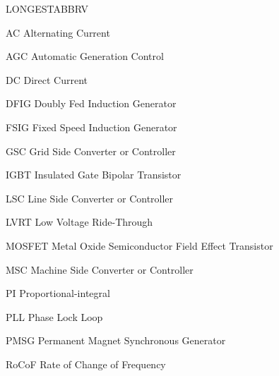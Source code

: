 \begin{theglossary}{LONGESTABBRV}

\item[AC] Alternating Current
\item[AGC] Automatic Generation Control
\item[DC] Direct Current
\item[DFIG] Doubly Fed Induction Generator
\item[FSIG] Fixed Speed Induction Generator
\item[GSC] Grid Side Converter or Controller
\item[IGBT] Insulated Gate Bipolar Transistor
\item[LSC] Line Side Converter or Controller
\item[LVRT] Low Voltage Ride-Through
\item[MOSFET] Metal Oxide Semiconductor Field Effect Transistor
\item[MSC] Machine Side Converter or Controller
\item[PI] Proportional-integral
\item[PLL] Phase Lock Loop
\item[PMSG] Permanent Magnet Synchronous Generator
\item[RoCoF] Rate of Change of Frequency

\end{theglossary}
